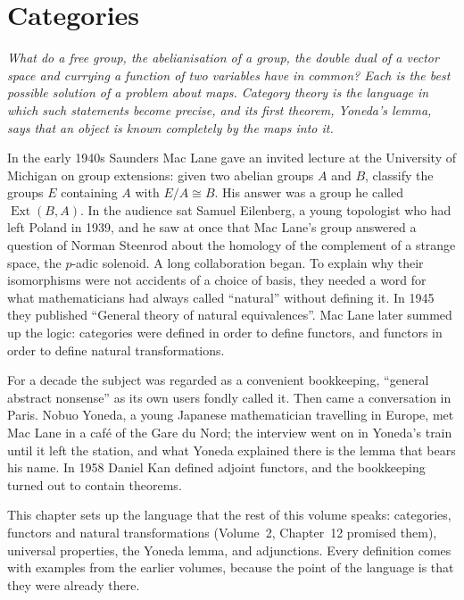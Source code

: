 \chapter{Categories}

\begin{center}\itshape
What do a free group, the abelianisation of a group, the double dual of a vector space and currying a function of two variables have in common? Each is the best possible
solution of a problem about maps. Category theory is the language in which such statements become precise, and its first theorem, Yoneda's lemma, says that an object is
known completely by the maps into it.
\end{center}

In the early 1940s Saunders Mac Lane gave an invited lecture at the University of Michigan on group extensions: given two abelian groups $A$ and $B$, classify the groups $E$
containing $A$ with $E/A\cong B$. His answer was a group he called $\operatorname{Ext}(B,A)$. In the audience sat Samuel Eilenberg, a young topologist who had left Poland in 1939,
and he saw at once that Mac Lane's group answered a question of Norman Steenrod about the homology of the complement of a strange space, the $p$-adic solenoid. A long
collaboration began. To explain why their isomorphisms were not accidents of a choice of basis, they needed a word for what
mathematicians had always called ``natural'' without defining it. In 1945 they published ``General theory of natural equivalences''. Mac Lane later summed up the logic:
categories were defined in order to define functors, and functors in order to define natural transformations.

For a decade the subject was regarded as a convenient bookkeeping, ``general abstract nonsense'' as its own users fondly called it. Then came a conversation in Paris. Nobuo
Yoneda, a young Japanese mathematician travelling in Europe, met Mac Lane in a café of the Gare du Nord; the interview went on in Yoneda's train until it left the station,
and what Yoneda explained there is the lemma that bears his name. In 1958 Daniel Kan defined adjoint functors, and the bookkeeping turned out to contain theorems.

This chapter sets up the language that the rest of this volume speaks: categories, functors and natural transformations (Volume~2, Chapter~12 promised them), universal
properties, the Yoneda lemma, and adjunctions. Every definition comes with examples from the earlier volumes, because the point of the language is that they were already
there.

